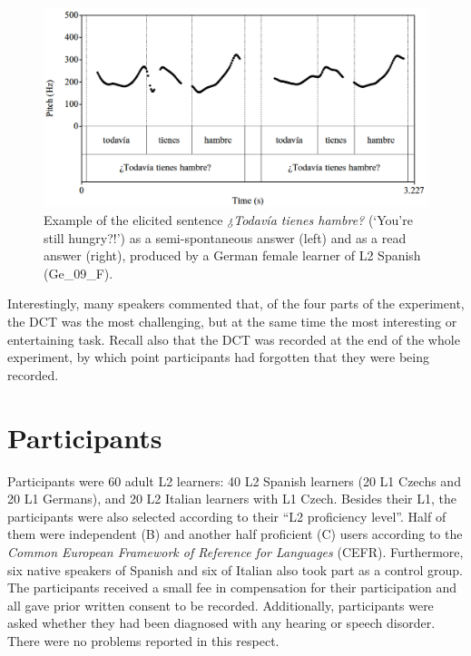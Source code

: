 \begin{figure}
\includegraphics[width=\textwidth]{figures/a03HabilMethodology-img001.png}




\caption{Example of the elicited sentence \textit{¿Todavía tienes hambre?} (‘You’re still hungry?!’) as a semi-spontaneous answer (left) and as a read answer (right), produced by a German female learner of L2 Spanish (Ge\_09\_F).}
\label{fig:3.1}
\end{figure}



Interestingly, many speakers commented that, of the four parts of the experiment, the DCT was the most challenging, but at the same time the most interesting or entertaining task. Recall also that the DCT was recorded at the end of the whole experiment, by which point participants had forgotten that they were being recorded.


\section{Participants}\label{sec:3.2}

Participants were 60 adult L2 learners: 40 L2 Spanish learners (20 L1 Czechs and 20 L1 Germans), and 20 L2 Italian learners with L1 Czech. Besides their L1, the participants were also selected according to their “L2 proficiency level”. Half of them were independent (B) and another half proficient (C) users according to the \textit{Common European Framework of Reference for Languages} (CEFR). Furthermore, six native speakers of Spanish and six of Italian also took part as a control group. The participants received a small fee in compensation for their participation and all gave prior written consent to be recorded. Additionally, participants were asked whether they had been diagnosed with any hearing or speech disorder. There were no problems reported in this respect.



